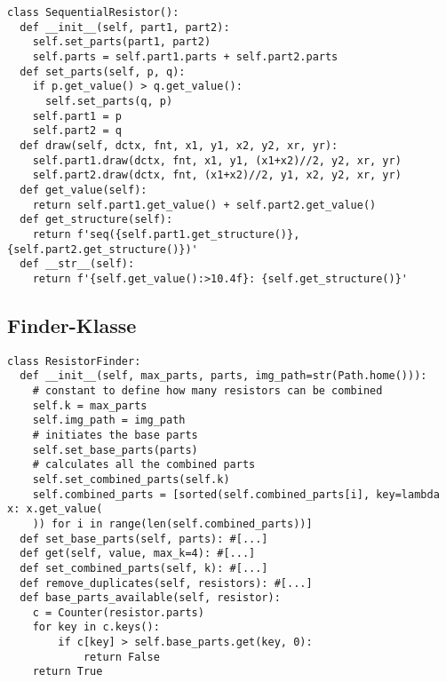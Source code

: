 \documentclass[a4paper,10pt,ngerman]{scrartcl}
\begin{document}
\begin{lstlisting}[frame=single]
class SequentialResistor():
  def __init__(self, part1, part2):
    self.set_parts(part1, part2)
    self.parts = self.part1.parts + self.part2.parts
  def set_parts(self, p, q):
    if p.get_value() > q.get_value():
      self.set_parts(q, p)
    self.part1 = p
    self.part2 = q
  def draw(self, dctx, fnt, x1, y1, x2, y2, xr, yr):
    self.part1.draw(dctx, fnt, x1, y1, (x1+x2)//2, y2, xr, yr)
    self.part2.draw(dctx, fnt, (x1+x2)//2, y1, x2, y2, xr, yr)
  def get_value(self):
    return self.part1.get_value() + self.part2.get_value()
  def get_structure(self):
    return f'seq({self.part1.get_structure()}, {self.part2.get_structure()})'
  def __str__(self):
    return f'{self.get_value():>10.4f}: {self.get_structure()}'
\end{lstlisting}
\subsection{Finder-Klasse}
\begin{lstlisting}[frame=single]
class ResistorFinder:
  def __init__(self, max_parts, parts, img_path=str(Path.home())):
    # constant to define how many resistors can be combined
    self.k = max_parts
    self.img_path = img_path
    # initiates the base parts
    self.set_base_parts(parts)
    # calculates all the combined parts
    self.set_combined_parts(self.k)
    self.combined_parts = [sorted(self.combined_parts[i], key=lambda x: x.get_value(
    )) for i in range(len(self.combined_parts))]
  def set_base_parts(self, parts): #[...]
  def get(self, value, max_k=4): #[...]
  def set_combined_parts(self, k): #[...]
  def remove_duplicates(self, resistors): #[...]
  def base_parts_available(self, resistor):
    c = Counter(resistor.parts)      
    for key in c.keys():             
        if c[key] > self.base_parts.get(key, 0):
            return False             
    return True                     
\end{lstlisting}
\end{document}

